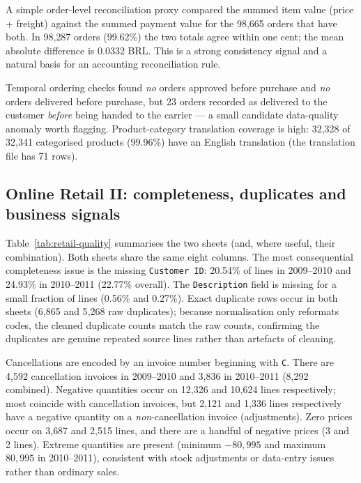 \documentclass[11pt,a4paper]{article}
\newcommand{\code}[1]{\texttt{#1}}
\begin{document}
A simple order-level reconciliation proxy compared the summed item value (price + freight) against the summed payment value for the 98{,}665 orders that have both. In 98{,}287 orders (99.62\%) the two totals agree within one cent; the mean absolute difference is 0.0332 BRL. This is a strong consistency signal and a natural basis for an accounting reconciliation rule.

Temporal ordering checks found \emph{no} orders approved before purchase and \emph{no} orders delivered before purchase, but 23 orders recorded as delivered to the customer \emph{before} being handed to the carrier --- a small candidate data-quality anomaly worth flagging. Product-category translation coverage is high: 32{,}328 of 32{,}341 categorised products (99.96\%) have an English translation (the translation file has 71 rows).

\subsection{Online Retail II: completeness, duplicates and business signals}
Table~\ref{tab:retail-quality} summarises the two sheets (and, where useful, their combination). Both sheets share the same eight columns. The most consequential completeness issue is the missing \code{Customer ID}: 20.54\% of lines in 2009--2010 and 24.93\% in 2010--2011 (22.77\% overall). The \code{Description} field is missing for a small fraction of lines (0.56\% and 0.27\%). Exact duplicate rows occur in both sheets (6{,}865 and 5{,}268 raw duplicates); because normalisation only reformats codes, the cleaned duplicate counts match the raw counts, confirming the duplicates are genuine repeated source lines rather than artefacts of cleaning.

Cancellations are encoded by an invoice number beginning with \code{C}. There are 4{,}592 cancellation invoices in 2009--2010 and 3{,}836 in 2010--2011 (8{,}292 combined). Negative quantities occur on 12{,}326 and 10{,}624 lines respectively; most coincide with cancellation invoices, but 2{,}121 and 1{,}336 lines respectively have a negative quantity on a \emph{non}-cancellation invoice (adjustments). Zero prices occur on 3{,}687 and 2{,}515 lines, and there are a handful of negative prices (3 and 2 lines). Extreme quantities are present (minimum $-80{,}995$ and maximum $80{,}995$ in 2010--2011), consistent with stock adjustments or data-entry issues rather than ordinary sales.
\end{document}
